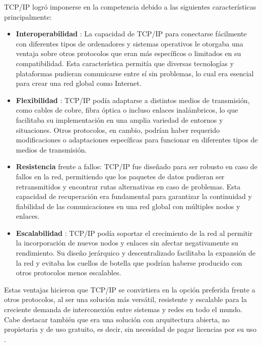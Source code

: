 TCP/IP logró imponerse en la competencia debido a las siguientes características principalmente:
\begin{itemize}
      \item \textbf{ Interoperabilidad }: La capacidad de TCP/IP para conectarse fácilmente con diferentes tipos de ordenadores y sistemas operativos le otorgaba una ventaja sobre otros protocolos que eran más específicos o limitados en su compatibilidad. Esta característica permitía que diversas tecnologías y plataformas pudieran comunicarse entre sí sin problemas, lo cual era esencial para crear una red global como Internet.

      \item \textbf{ Flexibilidad }: TCP/IP podía adaptarse a distintos medios de transmisión, como cables de cobre, fibra óptica o incluso enlaces inalámbricos, lo que facilitaba su implementación en una amplia variedad de entornos y situaciones. Otros protocolos, en cambio, podrían haber requerido modificaciones o adaptaciones específicas para funcionar en diferentes tipos de medios de transmisión.

      \item \textbf{ Resistencia }frente a fallos: TCP/IP fue diseñado para ser robusto en caso de fallos en la red, permitiendo que los paquetes de datos pudieran ser retransmitidos y encontrar rutas alternativas en caso de problemas. Esta capacidad de recuperación era fundamental para garantizar la continuidad y fiabilidad de las comunicaciones en una red global con múltiples nodos y enlaces.

      \item \textbf{ Escalabilidad }: TCP/IP podía soportar el crecimiento de la red al permitir la incorporación de nuevos nodos y enlaces sin afectar negativamente su rendimiento. Su diseño jerárquico y descentralizado facilitaba la expansión de la red y evitaba los cuellos de botella que podrían haberse producido con otros protocolos menos escalables.

\end{itemize}

Estas ventajas hicieron que TCP/IP se convirtiera en la opción preferida frente a otros protocolos, al ser una solución más versátil,
resistente y escalable para la creciente demanda de interconexión entre sistemas y redes en todo el mundo. Cabe destacar también que era una solución con arquitectura abierta, no propietaria y de uso gratuito, es decir, sin necesidad de pagar licencias por su uso \cite{edwardsFoundationInternetTCP2021}.

